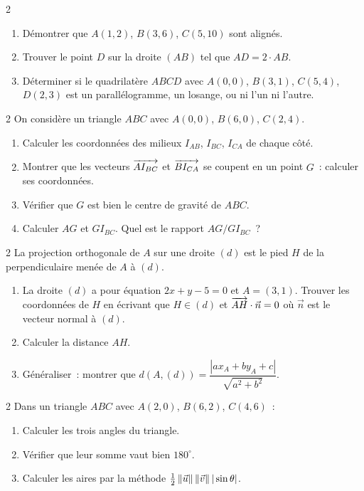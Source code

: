 \begin{exo}{2}
\begin{enumerate}
  \item D\'emontrer que $A(1,2)$, $B(3,6)$, $C(5,10)$ sont align\'es.
  \item Trouver le point $D$ sur la droite $(AB)$ tel que $AD = 2\cdot AB$.
  \item D\'eterminer si le quadrilat\`ere $ABCD$ avec $A(0,0)$, $B(3,1)$,
        $C(5,4)$, $D(2,3)$ est un parall\'elogramme, un losange, ou ni l'un ni l'autre.
\end{enumerate}
\end{exo}

\begin{exo}{2}
On consid\`ere un triangle $ABC$ avec $A(0,0)$, $B(6,0)$, $C(2,4)$.
\begin{enumerate}
  \item Calculer les coordonn\'ees des milieux $I_{AB}$, $I_{BC}$, $I_{CA}$
        de chaque c\^ot\'e.
  \item Montrer que les vecteurs $\overrightarrow{AI_{BC}}$ et $\overrightarrow{BI_{CA}}$
        se coupent en un point $G$~: calculer ses coordonn\'ees.
  \item V\'erifier que $G$ est bien le centre de gravité de $ABC$.
  \item Calculer $AG$ et $GI_{BC}$. Quel est le rapport $AG/GI_{BC}$~?
\end{enumerate}
\end{exo}

\begin{exo}{2}
La projection orthogonale de $A$ sur une droite $(d)$ est le pied $H$
de la perpendiculaire men\'ee de $A$ \`a $(d)$.
\begin{enumerate}
  \item La droite $(d)$ a pour \'equation $2x+y-5=0$ et $A=(3,1)$.
        Trouver les coordonn\'ees de $H$ en \'ecrivant que $H\in(d)$
        et $\overrightarrow{AH}\cdot\vec{n}=0$ o\`u $\vec{n}$ est le vecteur normal \`a $(d)$.
  \item Calculer la distance $AH$.
  \item G\'en\'eraliser~: montrer que $d(A,(d)) = \dfrac{|ax_A+by_A+c|}{\sqrt{a^2+b^2}}$.
\end{enumerate}
\end{exo}

\begin{exo}{2}
Dans un triangle $ABC$ avec $A(2,0)$, $B(6,2)$, $C(4,6)$~:
\begin{enumerate}
  \item Calculer les trois angles du triangle.
  \item V\'erifier que leur somme vaut bien $180^{\circ}$.
  \item Calculer les aires par la m\'ethode $\frac{1}{2}\left\|\vec{u}\right\|\left\|\vec{v}\right\||\sin\theta|$.
\end{enumerate}
\end{exo}

